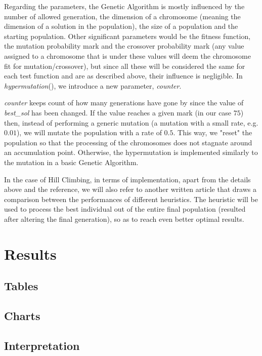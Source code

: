 \documentclass[a4paper]{article}
\begin{document}
Regarding the parameters, the Genetic Algorithm is mostly influenced by the number of allowed generation, the dimension of a chromosome (meaning the dimension of a solution in the population), the size of a population and the starting population. Other significant parameters would be the fitness function, the mutation probability mark and the crossover probability mark (any value assigned to a chromosome that is under these values will deem the chromosome fit for mutation/crossover), but since all these will be considered the same for each test function and are as described above, their influence is negligible.
In {\itshape hypermutation}()\cite{mutation}, we introduce a new parameter, {\itshape counter}. {{\itshape counter} keeps count of how many generations have gone by since the value of {\itshape best\_sol} has been changed. If the value reaches a given mark (in our case $75$) then, instead of performing a generic mutation (a mutation with a small rate, e.g. $0.01$), we will mutate the population with a rate of $0.5$. This way, we "reset" the population so that the processing of the chromosomes does not stagnate around an accumulation point. Otherwise, the hypermutation is implemented similarly to the mutation in a basic Genetic Algorithm.
	
In the case of Hill Climbing, in terms of implementation, apart from the details above and the reference, we will also refer to another written article\cite{T1} that draws a comparison between the performances of different heuristics. The heuristic will be used to process the best individual out of the entire final population (resulted after altering the final generation), so as to reach even better optimal results.

\section{Results}

\subsection{Tables}

\subsection{Charts}

\subsection{Interpretation}

}
\end{document}
